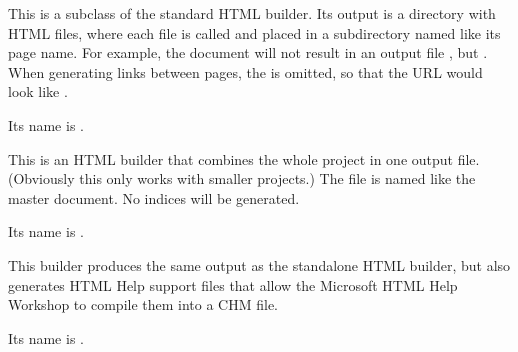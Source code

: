 \documentclass[letterpaper,10pt,english]{sphinxmanual}
\begin{document}

\begin{fulllineitems}
\label{builders:sphinx.builders.html.DirectoryHTMLBuilder}
This is a subclass of the standard HTML builder.  Its output is a directory
with HTML files, where each file is called  and placed in a
subdirectory named like its page name.  For example, the document
 will not result in an output file ,
but .  When generating links between pages, the
 is omitted, so that the URL would look like .

Its name is .


\end{fulllineitems}


\begin{fulllineitems}
\label{builders:sphinx.builders.html.SingleFileHTMLBuilder}
This is an HTML builder that combines the whole project in one output file.
(Obviously this only works with smaller projects.)  The file is named like
the master document.  No indices will be generated.

Its name is .


\end{fulllineitems}

\label{builders:module-sphinx.builders.htmlhelp}

\begin{fulllineitems}
\label{builders:sphinx.builders.htmlhelp.HTMLHelpBuilder}
This builder produces the same output as the standalone HTML builder, but
also generates HTML Help support files that allow the Microsoft HTML Help
Workshop to compile them into a CHM file.

Its name is .

\end{fulllineitems}
\end{document}
